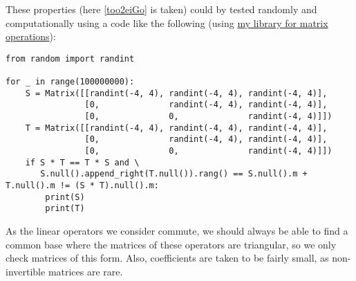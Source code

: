 \documentclass{article}
\theoremstyle{plain}\newtheorem{theorem}{Theorem}
\theoremstyle{plain}\newtheorem{proposition}{Proposition}
\theoremstyle{remark}\newtheorem{remark}{Remark}
\begin{document}
These properties (here \autoref{too2eiGo} is taken) could by tested randomly and computationally using a code like the following (using \href{https://github.com/afdw/matrix-operations/blob/main/main.py}{my library for matrix operations}):

\begin{verbatim}
from random import randint

for _ in range(100000000):
    S = Matrix([[randint(-4, 4), randint(-4, 4), randint(-4, 4)],
                [0,              randint(-4, 4), randint(-4, 4)],
                [0,              0,              randint(-4, 4)]])
    T = Matrix([[randint(-4, 4), randint(-4, 4), randint(-4, 4)],
                [0,              randint(-4, 4), randint(-4, 4)],
                [0,              0,              randint(-4, 4)]])
    if S * T == T * S and \
       S.null().append_right(T.null()).rang() == S.null().m + T.null().m != (S * T).null().m:
        print(S)
        print(T)
\end{verbatim}

As the linear operators we consider commute, we should always be able to find a common base where the matrices of these operators are triangular, so we only check matrices of this form. Also, coefficients are taken to be fairly small, as non-invertible matrices are rare.
\end{document}
